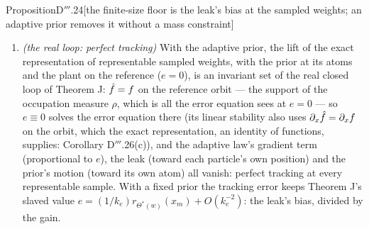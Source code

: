 \begin{thm}{Proposition}{D$'''$.24}[the finite-size floor is the leak's bias at the sampled weights; an adaptive prior
removes it without a mass constraint]
\begin{enumerate}[label=\textup{(\roman*)}]
    the collective rate, $\lambda_j^-$ in place of $h_j + \sigma_0$ (Theorem D$'''$.23(ii)), the leak's a-priori bound
    (restored by projecting the prior, Proposition D$'''$.27), and a larger coupled distance.
  \item \emph{(the real loop: perfect tracking)} With the adaptive prior, the lift of the exact representation of
    representable sampled weights, with the prior at its atoms and the plant on the reference ($e = 0$), is an
    invariant set of the real closed loop of Theorem J: $\hat f = f$ on the reference orbit --- the support of the
    occupation measure $\rho$, which is all the error equation sees at $e = 0$ --- so $e\equiv0$ solves the error
    equation there (its linear stability also uses $\partial_x\hat f = \partial_xf$ on the orbit, which the exact
    representation, an identity of functions, supplies: Corollary D$'''$.26(c)), and the adaptive law's gradient term
    (proportional to $e$), the leak (toward each particle's own position) and the prior's motion (toward its own atom)
    all vanish: perfect tracking at every representable sample. With a fixed prior the tracking error keeps Theorem
    J's slaved value $e = (1/k_e)r_{\Theta^*(w)}(x_m) + O(k_e^{-2})$: the leak's bias, divided by the gain.
\end{enumerate}
\end{thm}

